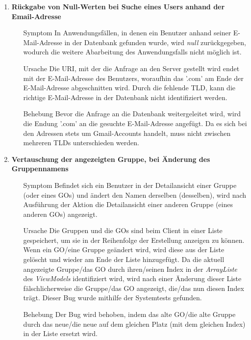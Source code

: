 \documentclass[11pt,a4paper]{scrartcl}
\def\threedigits#1{%
  \ifnum#1<100 0\fi
  \ifnum#1<10 0\fi
  \number#1}
\begin{document}
\begin{enumerate}[label={\textbf{/B\protect\threedigits{\theenumi}0/}}, leftmargin=*]
\item \textbf{Rückgabe von Null-Werten bei Suche eines Users anhand der Email-Adresse}
	\begin{itemize}
		\item[Symptom] In Anwendungsfällen, in denen ein Benutzer anhand seiner E-Mail-Adresse in der Datenbank gefunden wurde, wird \textit{null} zurückgegeben, wodurch die weitere Abarbeitung des Anwendungsfalls nicht möglich ist.
		\item[Ursache] Die URI, mit der die Anfrage an den Server gestellt wird endet mit der E-Mail-Adresse des Benutzers, woraufhin das '.com' am Ende der E-Mail-Adresse abgeschnitten wird. Durch die fehlende TLD, kann die richtige E-Mail-Adresse in der Datenbank nicht identifiziert werden.
		\item[Behebung] Bevor die Anfrage an die Datenbank weitergeleitet wird, wird die Endung '.com' an die gesuchte E-Mail-Adresse angefügt. Da es sich bei den Adressen stets um Gmail-Accounts handelt, muss nicht zwischen mehreren TLDs unterschieden werden.
	\end{itemize}
	
\item \textbf{Vertauschung der angezeigten Gruppe, bei Änderung des Gruppennamens}
	\begin{itemize}
		\item[Symptom] Befindet sich ein Benutzer in der Detailansicht einer Gruppe (oder eines GOs) und ändert den Namen derselben (desselben), wird nach Ausführung der Aktion die Detailansicht einer anderen Gruppe (eines anderen GOs) angezeigt.
		\item[Ursache] Die Gruppen und die GOs sind beim Client in einer Liste gespeichert, um sie in der Reihenfolge der Erstellung anzeigen zu können. Wenn ein GO/eine Gruppe geändert wird, wird diese aus der Liste gelöscht und wieder am Ende der Liste hinzugefügt. Da die aktuell angezeigte Gruppe/das GO durch ihren/seinen Index in der \textit{ArrayListe} des \textit{ViewModels} identifiziert wird, wird nach einer Änderung dieser Liste fälschlicherweise die Gruppe/das GO angezeigt, die/das nun diesen Index trägt. Dieser Bug wurde mithilfe der Systemtests gefunden.
		\item[Behebung] Der Bug wird behoben, indem das alte GO/die alte Gruppe durch das neue/die neue auf dem gleichen Platz (mit dem gleichen Index) in der Liste ersetzt wird.
	\end{itemize}
	

\end{enumerate}
\end{document}
